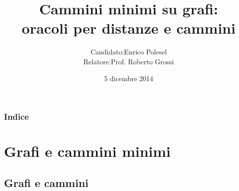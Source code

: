 \documentclass{beamer}
\theoremstyle{plain}
\theoremstyle{definition}
\theoremstyle{remark}
\begin{document}
\title[Oracoli per cammini e distanze]{Cammini minimi su grafi:\\
  oracoli per distanze e cammini}
\date{5 dicembre 2014}

\author[Enrico Polesel]{\begin{tabular}{r@{ }l}
Candidato: &  Enrico Polesel \\ 
Relatore: & Prof. Roberto Grossi
\end{tabular}
}



\begin{frame}[plain]
  \titlepage
\end{frame}

\begin{frame}[plain]
 \frametitle{Indice}
 \tableofcontents
\end{frame}




\AtBeginSubsection[]
{
  \begin{frame}[plain]{\secname $\rightarrow$ \subsecname}
    \tableofcontents[currentsubsection]
  \end{frame}
}


\section{Grafi e cammini minimi}

\subsection{Grafi e cammini}
\end{document}
